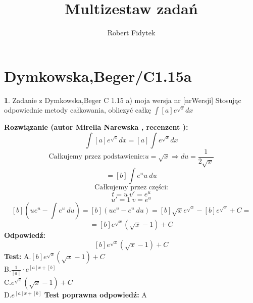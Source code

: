 \documentclass[12pt, a4paper]{article}
\title{Multizestaw zadań}
\author{Robert Fidytek}
\date{}
\theoremstyle{definition} %
\newtheorem{zad}{}
\newcommand{\kategoria}[1]{\section{#1}} %
\newcommand{\zadStart}[1]{\begin{zad}#1\newline} %
\newcommand{\zadStop}{\end{zad}}   %
\newcommand{\rozwStart}[2]{\noindent \textbf{Rozwiązanie (autor #1 , recenzent #2): }\newline} %
\newcommand{\odpStart}{\noindent \textbf{Odpowiedź:}\newline}    %
\newcommand{\odpStop}{\newline}                                             %
\newcommand{\testStart}{\noindent \textbf{Test:}\newline} %
\newcommand{\testStop}{\newline} %
\newcommand{\kluczStart}{\noindent \textbf{Test poprawna odpowiedź:}\newline} %
\newcommand{\kluczStop}{\newline} %
\begin{document}
\maketitle



\kategoria{Dymkowska,Beger/C1.15a}
\zadStart{Zadanie z Dymkowska,Beger C 1.15 a) moja wersja nr [nrWersji]}
Stosując odpowiednie metody całkowania, obliczyć całkę $\displaystyle \int [a]e^{\sqrt{x}}dx$
\zadStop
\rozwStart{Mirella Narewska}{}
$$\int [a]e^{\sqrt{x}}dx=[a]\int e^{\sqrt{x}}dx$$
$$\text{Całkujemy przez podstawienie:} u=\sqrt{x} \Rightarrow du=\frac{1}{2\sqrt{x}}$$
$$=[b]\int e^{u}u \ du$$
$$\text{Całkujemy przez części:}$$
$$t=u \ v'=e^u$$
$$u'=1 \ v=e^u$$
$$[b]\left( ue^u -\int e^u \ du\right)= [b]\left( ue^u -e^u \ du\right)=[b]\sqrt{x}e^{\sqrt{x}} - [b]e^{\sqrt{x}}+C=$$
$$=[b]e^{\sqrt{x}}(\sqrt{x}-1)+C$$
\odpStart
$$[b]e^{\sqrt{x}}(\sqrt{x}-1)+C$$
\odpStop
\testStart
A.$[b]e^{\sqrt{x}}(\sqrt{x}-1)+C$
\\
B.$\frac{1}{[a]}\cdot e^{[a]x+[b]}$
\\
C.$e^{\sqrt{x}}(\sqrt{x}-1)+C$
\\
D.$e^{[a]x+[b]}$
\testStop
\kluczStart
A
\kluczStop
\end{document}
